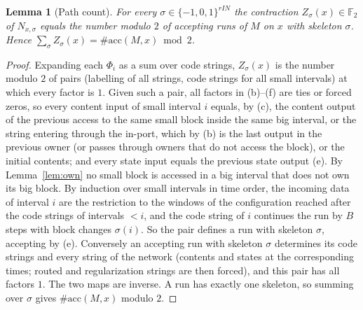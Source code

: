 \documentclass[11pt]{article}
\newtheorem{lemma}[theorem]{Lemma}
\theoremstyle{definition}
\theoremstyle{remark}
\newcommand{\F}{\mathbb F}
\newcommand{\acc}{\#\mathrm{acc}}
\begin{document}
\begin{lemma}[Path count]\label{lem:pathcount}
For every $\sigma\in\{-1,0,1\}^{rIN}$ the contraction $Z_\sigma(x)\in\F_2$ of $N_{x,\sigma}$ equals the number modulo $2$ of
accepting runs of $M$ on $x$ with skeleton $\sigma$. Hence $\sum_\sigma Z_\sigma(x)=\acc(M,x)\bmod2$.
\end{lemma}
\begin{proof}
Expanding each $\Phi_i$ as a sum over code strings, $Z_\sigma(x)$ is the number modulo $2$ of pairs (labelling of all strings,
code strings for all small intervals) at which every factor is $1$. Given such a pair, all factors in (b)--(f) are ties or forced
zeros, so every content input of small interval $i$ equals, by (c), the content output of the previous access to the same small
block inside the same big interval, or the string entering through the in-port, which by (b) is the last output in the previous
owner (or passes through owners that do not access the block), or the initial contents; and every state input equals the
previous state output (e). By Lemma~\ref{lem:own} no small block is accessed in a big interval that does not own its big block.
By induction over small intervals in time order, the incoming data of interval $i$ are the restriction to the windows of the
configuration reached after the code strings of intervals $<i$, and the code string of $i$ continues the run by $B$ steps with
block changes $\sigma(i)$. So the pair defines a run with skeleton $\sigma$, accepting by (e). Conversely an accepting run with
skeleton $\sigma$ determines its code strings and every string of the network (contents and states at the corresponding times;
routed and regularization strings are then forced), and this pair has all factors $1$. The two maps are inverse.
A run has exactly one skeleton, so summing over $\sigma$ gives $\acc(M,x)$ modulo $2$.
\end{proof}
\end{document}
